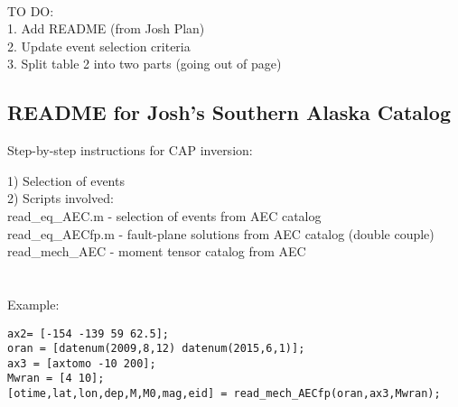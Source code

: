 \documentclass[11pt,titlepage,fleqn]{article}
\begin{document}


\noindent
\\
TO DO:\\
1. Add README (from Josh Plan)\\
2. Update event selection criteria\\
3. Split table 2 into two parts (going out of page)\\


\subsection*{README for Josh's Southern Alaska Catalog}



Step-by-step instructions for CAP inversion:


1) Selection of events\\
2) Scripts involved:\\

read\_eq\_AEC.m - selection of events from AEC catalog\\
read\_eq\_AECfp.m - fault-plane solutions from AEC catalog (double couple)\\
read\_mech\_AEC - moment tensor catalog from AEC \\
\\
\\
Example:

\begin{verbatim}
ax2= [-154 -139 59 62.5];      
oran = [datenum(2009,8,12) datenum(2015,6,1)];     
ax3 = [axtomo -10 200];
Mwran = [4 10];
[otime,lat,lon,dep,M,M0,mag,eid] = read_mech_AECfp(oran,ax3,Mwran);
\end{verbatim}
\end{document}
